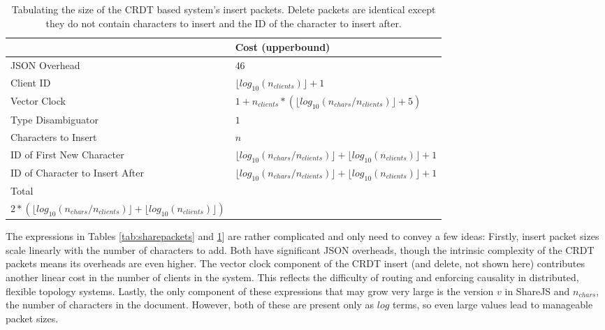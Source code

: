\documentclass[12pt,a4paper,twoside,openright]{report}
\begin{document}
			\begin{table}[htb]
			\centering
			\caption[CRDT System Insert Packet Size]{Tabulating the size of the CRDT based system's insert packets. Delete packets are identical except they do not contain characters to insert and the ID of the character to insert after.}
			\label{tab:crdtinsertpacket}
			\begin{tabular}{@{}ll@{}}
			
                             & Cost (upperbound)\\ \toprule                                                                                                                                                       
			JSON Overhead                   & $46$ \\ \midrule
			Client ID                       & $\lfloor log_{10}(n_{clients}) \rfloor+1$  \\ \midrule
			Vector Clock                    & $1 + n_{clients} * (\lfloor log_{10}(n_{chars}/n_{clients})\rfloor + 5)$ \\ \midrule
			Type Disambiguator              & $1$ \\ \midrule
			Characters to Insert            & $n$ \\ \midrule
			ID of First New Character       & $\lfloor log_{10}(n_{chars}/n_{clients}) \rfloor + \lfloor log_{10}(n_{clients}) \rfloor  +1$  \\ \midrule
			ID of Character to Insert After & $\lfloor log_{10}(n_{chars}/n_{clients}) \rfloor + \lfloor log_{10}(n_{clients}) \rfloor +1$  \\ \bottomrule
			Total                           & \makecell{$51 + n + 5n_{clients} + n_{clients} *(\lfloor log_{10}(n_{chars}/n_{clients}\rfloor) +$ \\ $2*(\lfloor log_{10}(n_{chars}/n_{clients}) \rfloor + \lfloor log_{10}(n_{clients}) \rfloor)$}
			\end{tabular}
			\end{table}
			
			The expressions in Tables \ref{tab:sharepackets} and \ref{tab:crdtinsertpacket}] are rather complicated and only need to convey a few ideas: Firstly, insert packet sizes scale linearly with the number of characters to add. Both have significant JSON overheads, though the intrinsic complexity of the CRDT packets means its overheads are even higher. The vector clock component of the CRDT insert (and delete, not shown here) contributes another linear cost in the number of clients in the system. This reflects the difficulty of routing and enforcing causality in distributed, flexible topology systems. Lastly, the only component of these expressions that may grow very large is the version $v$ in ShareJS and $n_{chars}$, the number of characters in the document. However, both of these are present only as $log$ terms, so even large values lead to manageable packet sizes.
			
\end{document}
